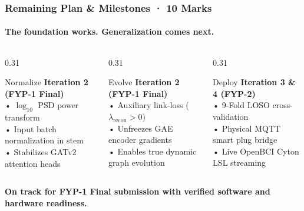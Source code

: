 \documentclass[aspectratio=169,10pt]{beamer}
\begin{document}
\begin{frame}
    \frametitle{Remaining Plan & Milestones · 10 Marks}
    \framesubtitle{The foundation works. Generalization comes next.}
    \begin{columns}[T]
        \begin{column}{0.31\textwidth}
            \begin{block}{\small Normalize}
                \scriptsize
                \textbf{Iteration 2 (FYP-1 Final)}\\
                • $\log_{10}$ PSD power transform\\
                • Input batch normalization in stem\\
                • Stabilizes GATv2 attention heads
            \end{block}
        \end{column}
        \begin{column}{0.31\textwidth}
            \begin{block}{\small Evolve}
                \scriptsize
                \textbf{Iteration 2 (FYP-1 Final)}\\
                • Auxiliary link-loss ($\lambda_{\mathrm{recon}} > 0$)\\
                • Unfreezes GAE encoder gradients\\
                • Enables true dynamic graph evolution
            \end{block}
        \end{column}
        \begin{column}{0.31\textwidth}
            \begin{block}{\small Deploy}
                \scriptsize
                \textbf{Iteration 3 \& 4 (FYP-2)}\\
                • 9-Fold LOSO cross-validation\\
                • Physical MQTT smart plug bridge\\
                • Live OpenBCI Cyton LSL streaming
            \end{block}
        \end{column}
    \end{columns}
    \vspace{0.2cm}
    {\scriptsize \textbf{On track for FYP-1 Final submission with verified software and hardware readiness.}}
\end{frame}
\end{document}

